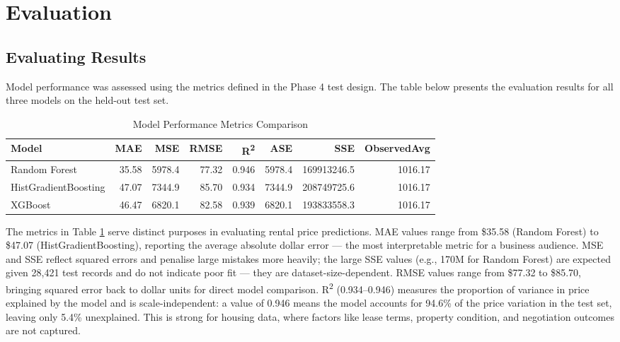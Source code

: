 \section{Evaluation}

\subsection{Evaluating Results}
\label{subsec:Evaluating Results}

\noindent
Model performance was assessed using the metrics defined in the Phase 4 test design. The table below presents the evaluation results for all three models on the held-out test set.

\begin{table}[ht]
\centering
\small
\begin{adjustbox}{max width=\textwidth}
\begin{tabular}{|l|r|r|r|r|r|r|r|}
\hline
\hline
Model & MAE & MSE & RMSE & R\textsuperscript{2} & ASE & SSE & ObservedAvg\\
\hline
Random Forest & 35.58 & 5978.4 & 77.32 & 0.946 & 5978.4 & 169913246.5 & 1016.17\\
HistGradientBoosting & 47.07 & 7344.9 & 85.70 & 0.934 & 7344.9 & 208749725.6 & 1016.17\\
XGBoost & 46.47 & 6820.1 & 82.58 & 0.939 & 6820.1 & 193833558.3 & 1016.17\\
\hline
\hline
\end{tabular}
\end{adjustbox}
\caption{Model Performance Metrics Comparison}
\label{tab:model_performance}
\end{table}

\vspace{-24pt}
\noindent
The metrics in Table \ref{tab:model_performance} serve distinct purposes in evaluating rental price predictions. MAE values range from \$35.58 (Random Forest) to \$47.07 (HistGradientBoosting), reporting the average absolute dollar error — the most interpretable metric for a business audience. MSE and SSE reflect squared errors and penalise large mistakes more heavily; the large SSE values (e.g., 170M for Random Forest) are expected given 28,421 test records and do not indicate poor fit — they are dataset-size-dependent. RMSE values range from \$77.32 to \$85.70, bringing squared error back to dollar units for direct model comparison. R\textsuperscript{2} (0.934--0.946) measures the proportion of variance in price explained by the model and is scale-independent: a value of 0.946 means the model accounts for 94.6\% of the price variation in the test set, leaving only 5.4\% unexplained. This is strong for housing data, where factors like lease terms, property condition, and negotiation outcomes are not captured.

